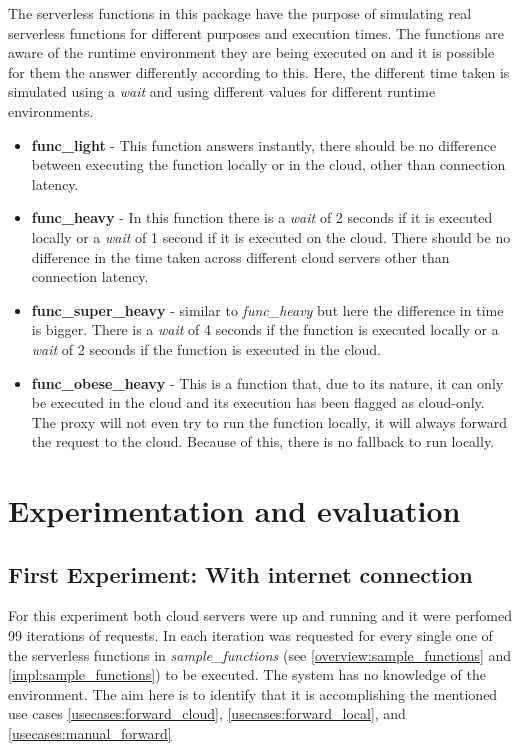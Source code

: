 \documentclass[conference]{IEEEtran}
\begin{document}
The serverless functions in this package have the purpose of simulating real serverless
functions for different purposes and execution times. The functions are aware of
the runtime environment they are being executed on and it is possible for them the answer
differently according to this. Here, the different time taken is simulated using a
\textit{wait} and using different values for different runtime environments.
 

\begin{itemize}
    \item \textbf{func\_light} - This function answers instantly, there should be
        no difference between executing the function locally or in the cloud,
        other than connection latency.
    \item \textbf{func\_heavy} - In this function there is a \textit{wait} of 2 seconds if
        it is executed locally or a \textit{wait} of 1 second if it is executed on the cloud. There should be no difference in the time taken across different cloud servers other than connection latency.
    \item \textbf{func\_super\_heavy} - similar to \textit{func\_heavy} but here the difference in time is bigger. There is a \textit{wait} of 4 seconds if the function is executed locally or a \textit{wait} of 2 seconds if the function is executed in the cloud.
    \item \textbf{func\_obese\_heavy} - This is a function that, due to its nature, it can
        only be executed in the cloud and its execution has been flagged as cloud-only. The proxy will not even try to run the function locally, it will always forward the request to the cloud. Because of this, there is no fallback to run locally.
\end{itemize}



\section{Experimentation and evaluation}

\subsection{First Experiment: With internet connection}
For this experiment both cloud servers were up and running and it were perfomed
99 iterations of requests. In each iteration was requested for every single one
of the serverless functions in \textit{sample\_functions} (see
\ref{overview:sample_functions} and \ref{impl:sample_functions}) to be executed.
The system has no knowledge of the environment. The aim here is to identify
that it is accomplishing the mentioned use cases \ref{usecases:forward_cloud},
\ref{usecases:forward_local}, and \ref{usecases:manual_forward}
\end{document}
